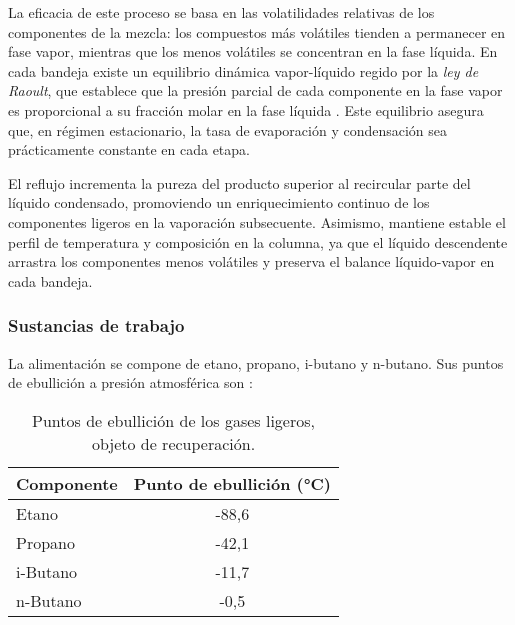 La eficacia de este proceso se basa en las volatilidades relativas de los componentes de la mezcla: los compuestos más volátiles tienden a permanecer en fase vapor, mientras que los menos volátiles se concentran en la fase líquida. En cada bandeja existe un equilibrio dinámica vapor-líquido regido por la \emph{ley de Raoult}, que establece que la presión parcial de cada componente en la fase vapor es proporcional a su fracción molar en la fase líquida \parencite{subsec5_3ref4}. Este equilibrio asegura que, en régimen estacionario, la tasa de evaporación y condensación sea prácticamente constante en cada etapa.

El reflujo incrementa la pureza del producto superior al recircular parte del líquido condensado, promoviendo un enriquecimiento continuo de los componentes ligeros en la vaporación subsecuente. Asimismo, mantiene estable el perfil de temperatura y composición en la columna, ya que el líquido descendente arrastra los componentes menos volátiles y preserva el balance líquido-vapor en cada bandeja.

\subsubsection{Sustancias de trabajo}
La alimentación se compone de etano, propano, i-butano y n-butano. Sus puntos de ebullición a presión atmosférica son \parencite{subsec5_3ref6}:

\begin{table}[ht]
    \centering
    \begin{tabular}{|l|c|}
        \hline
        \textbf{Componente} & \textbf{Punto de ebullición (°C)} \\ \hline
        Etano               & -88,6                             \\ \hline
        Propano             & -42,1                             \\ \hline
        i-Butano            & -11,7                             \\ \hline
        n-Butano            & -0,5                              \\ \hline
    \end{tabular}
    \caption{Puntos de ebullición de los gases ligeros, objeto de recuperación.}
\end{table}
